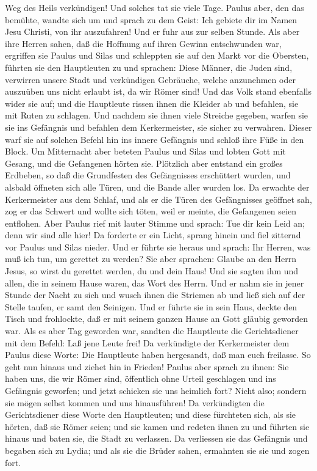 Weg des Heils verkündigen!  Und solches tat sie viele
Tage. Paulus aber, den das bemühte, wandte sich um und sprach zu dem
Geist: Ich gebiete dir im Namen Jesu Christi, von ihr auszufahren! Und
er fuhr aus zur selben Stunde.  Als aber ihre Herren
sahen, daß die Hoffnung auf ihren Gewinn entschwunden war, ergriffen sie
Paulus und Silas und schleppten sie auf den Markt vor die Obersten,
 führten sie den Hauptleuten zu und sprachen: Diese
Männer, die Juden sind, verwirren unsere Stadt  und
verkündigen Gebräuche, welche anzunehmen oder auszuüben uns nicht
erlaubt ist, da wir Römer sind!  Und das Volk stand
ebenfalls wider sie auf; und die Hauptleute rissen ihnen die Kleider ab
und befahlen, sie mit Ruten zu schlagen.  Und nachdem sie
ihnen viele Streiche gegeben, warfen sie sie ins Gefängnis und befahlen
dem Kerkermeister, sie sicher zu verwahren.  Dieser warf
sie auf solchen Befehl hin ins innere Gefängnis und schloß ihre Füße in
den Block.  Um Mitternacht aber beteten Paulus und Silas
und lobten Gott mit Gesang, und die Gefangenen hörten sie.
 Plötzlich aber entstand ein großes Erdbeben, so daß die
Grundfesten des Gefängnisses erschüttert wurden, und alsbald öffneten
sich alle Türen, und die Bande aller wurden los.  Da
erwachte der Kerkermeister aus dem Schlaf, und als er die Türen des
Gefängnisses geöffnet sah, zog er das Schwert und wollte sich töten,
weil er meinte, die Gefangenen seien entflohen.  Aber
Paulus rief mit lauter Stimme und sprach: Tue dir kein Leid an; denn wir
sind alle hier!  Da forderte er ein Licht, sprang hinein
und fiel zitternd vor Paulus und Silas nieder.  Und er
führte sie heraus und sprach: Ihr Herren, was muß ich tun, um gerettet
zu werden?  Sie aber sprachen: Glaube an den Herrn Jesus,
so wirst du gerettet werden, du und dein Haus!  Und sie
sagten ihm und allen, die in seinem Hause waren, das Wort des Herrn.
 Und er nahm sie in jener Stunde der Nacht zu sich und
wusch ihnen die Striemen ab und ließ sich auf der Stelle taufen, er samt
den Seinigen.  Und er führte sie in sein Haus, deckte den
Tisch und frohlockte, daß er mit seinem ganzen Hause an Gott gläubig
geworden war.  Als es aber Tag geworden war, sandten die
Hauptleute die Gerichtsdiener mit dem Befehl: Laß jene Leute frei!
 Da verkündigte der Kerkermeister dem Paulus diese Worte:
Die Hauptleute haben hergesandt, daß man euch freilasse. So geht nun
hinaus und ziehet hin in Frieden!  Paulus aber sprach zu
ihnen: Sie haben uns, die wir Römer sind, öffentlich ohne Urteil
geschlagen und ins Gefängnis geworfen; und jetzt schicken sie uns
heimlich fort? Nicht also; sondern sie mögen selbst kommen und uns
hinausführen!  Da verkündigten die Gerichtsdiener diese
Worte den Hauptleuten; und diese fürchteten sich, als sie hörten, daß
sie Römer seien;  und sie kamen und redeten ihnen zu und
führten sie hinaus und baten sie, die Stadt zu verlassen.
 Da verliessen sie das Gefängnis und begaben sich zu
Lydia; und als sie die Brüder sahen, ermahnten sie sie und zogen fort.


